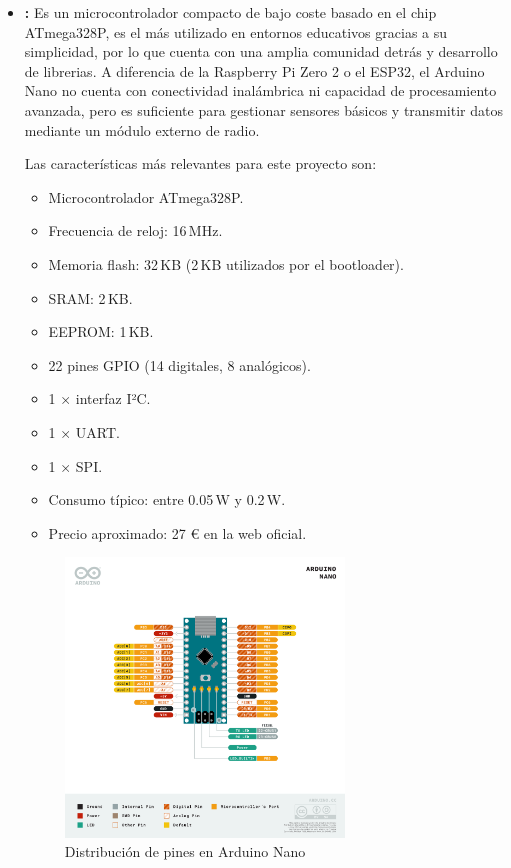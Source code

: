\begin{itemize}
    \item \textbf{\cite{arduino_nano}:}
    Es un microcontrolador compacto de bajo coste basado en el chip ATmega328P, es el más utilizado en entornos educativos gracias a su simplicidad,
    por lo que cuenta con una amplia comunidad detrás y desarrollo de librerias.
    A diferencia de la Raspberry Pi Zero 2 o el ESP32, el Arduino Nano no cuenta con conectividad inalámbrica ni capacidad de procesamiento avanzada,
    pero es suficiente para gestionar sensores básicos y transmitir datos mediante un módulo externo de radio.

    Las características más relevantes para este proyecto son:
    \begin{itemize}
        \item Microcontrolador ATmega328P.
        \item Frecuencia de reloj: 16\,MHz.
        \item Memoria flash: 32\,KB (2\,KB utilizados por el bootloader).
        \item SRAM: 2\,KB.
        \item EEPROM: 1\,KB.
        \item 22 pines GPIO (14 digitales, 8 analógicos).
        \item 1 × interfaz I²C.
        \item 1 × UART.
        \item 1 × SPI.
        \item Consumo típico: entre 0.05\,W y 0.2\,W.
        \item Precio aproximado: 27 € en la web oficial.
    \end{itemize}

    \begin{figure}[H]
        \centering
        \includegraphics[width=0.7\textwidth]{Imagenes/Bitmap/arduinoNanogpio}
        \caption{Distribución de pines en Arduino Nano}
        \label{fig:arduino_nano_gpio}
    \end{figure}


\end{itemize}
